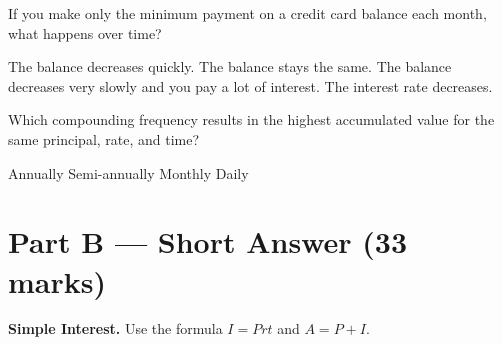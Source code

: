\documentclass[addpoints]{exam}
\begin{document}
\begin{questions}
\question[1]
If you make only the minimum payment on a credit card balance each month, what happens over time?
\begin{choices}
    \choice The balance decreases quickly.
    \choice The balance stays the same.
    \correctchoice The balance decreases very slowly and you pay a lot of interest.
    \choice The interest rate decreases.
\end{choices}

\question[1]
Which compounding frequency results in the highest accumulated value for the same principal, rate, and time?
\begin{choices}
    \choice Annually
    \choice Semi-annually
    \choice Monthly
    \correctchoice Daily
\end{choices}

\section*{Part B --- Short Answer (33 marks)}

\question[6]
\textbf{Simple Interest.} Use the formula $I = Prt$ and $A = P + I$.

\end{questions}
\end{document}
